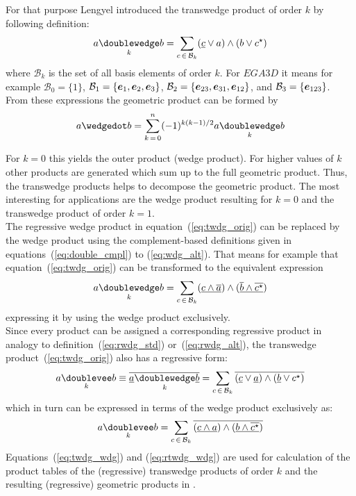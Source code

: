 For that purpose Lengyel introduced the transwedge product of order $k$ by following
definition:
\begin{equation}
    a \underset{k}{\doublewedge} b = \sum_{c \, \in \, \mathcal{B}_k}
    (\lcmpl{c}\vee a) \wedge (b \vee \rightbulkdual{c})
    \label{eq:twdg_orig}
\end{equation}
where $\mathcal{B}_k$ is the set of all basis elements of order $k$. For $EGA3D$ it means
for example $\mathcal{B}_0 = \{1\}$, $\mathcal{B}_1 = \{\bm{e}_{1}, \bm{e}_{2}, \bm{e}_{3}\}$,
$\mathcal{B}_2 = \{\bm{e}_{23}, \bm{e}_{31}, \bm{e}_{12}\}$, and $\mathcal{B}_3 = \{\bm{e}_{123}\}$. From
these expressions the geometric product can be formed by
\begin{equation}
    a \wedgedot b = \sum_{k \, = \, 0}^{n} (-1)^{k(k-1)/2} a \underset{k}{\doublewedge} b
    \label{eq:grp_twdg}
\end{equation}

For $k=0$ this yields the outer product (wedge product). For higher values of $k$ other
products are generated which sum up to the full geometric product. Thus, the transwedge
products helps to decompose the geometric product. The most interesting for applications
are the wedge product resulting for $k=0$ and the transwedge product of order $k=1$. \\

The regressive wedge product in equation~(\ref{eq:twdg_orig}) can be replaced by the wedge
product using the complement-based definitions given in equations~(\ref{eq:double_cmpl})
to (\ref{eq:wdg_alt}). That means for example that equation~(\ref{eq:twdg_orig}) can be
transformed to the equivalent expression
\begin{equation}
    a \underset{k}{\doublewedge} b = \sum_{c \, \in \, \mathcal{B}_k}
    (\lcmpl{c \wedge \rcmpl{a}}) \wedge
    (\lcmpl{\rcmpl{b} \wedge \rcmpl{\rightbulkdual{c}}})
    \label{eq:twdg_wdg}
\end{equation}
expressing it by using the wedge product exclusively. \\

Since every product can be assigned a corresponding regressive product in analogy to
definition~(\ref{eq:rwdg_std}) or~(\ref{eq:rwdg_alt}), the transwedge
product~(\ref{eq:twdg_orig}) also has a regressive form:
\begin{equation}
    a \underset{k}{\doublevee} b \equiv
    \rcmpl{\lcmpl{a} \underset{k}{\doublewedge} \lcmpl{b}} =
    \sum_{c \, \in \, \mathcal{B}_k} \rcmpl{
    (\lcmpl{c}\vee \lcmpl{a}) \wedge (\lcmpl{b} \vee \rightbulkdual{c})}
    \label{eq:rtwdg_orig}
\end{equation}
which in turn can be expressed in terms of the wedge product exclusively as:
\begin{equation}
    a \underset{k}{\doublevee} b = \sum_{c \, \in \, \mathcal{B}_k}  \rcmpl{
    (\lcmpl{c\wedge a}) \wedge (\lcmpl{b \wedge \rcmpl{\rightbulkdual{c}}})}
    \label{eq:rtwdg_wdg}
\end{equation}
Equations~(\ref{eq:twdg_wdg}) and (\ref{eq:rtwdg_wdg}) are used for calculation of the
product tables of the (regressive) transwedge products of order $k$ and the resulting
(regressive) geometric products in . \\

